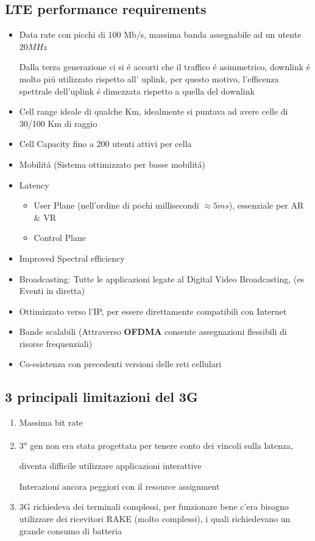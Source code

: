 \documentclass{article}
\begin{document}
\subsection{LTE performance requirements}
\begin{itemize}
    \item Data rate con picchi di 100 Mb/s, massima banda assegnabile ad un utente $20MHz$

        Dalla terza generazione ci si \'e accorti che il traffico \'e asimmetrico, downlink \'e molto pi\'u utilizzato rispetto all' uplink, per questo motivo, l'efficenza spettrale dell'uplink \'e dimezzata rispetto a quella del downlink

    \item Cell range ideale di qualche Km, idealmente si puntava ad avere celle di 30/100 Km di raggio

    \item Cell Capacity fino a 200 utenti attivi per cella
    \item Mobilit\'a (Sistema ottimizzato per basse mobilit\'a)
    \item Latency
        \begin{itemize}
            \item User Plane (nell'ordine di pochi millisecondi $\approx 5ms$), essenziale per AR \& VR
            \item Control Plane
        \end{itemize}

    \item Improved Spectral efficiency
    \item Broadcasting: Tutte le applicazioni legate al Digital Video Broadcasting, (es Eventi in diretta)
    \item Ottimizzato verso l'IP, per essere direttamente compatibili con Internet
    \item Bande scalabili (Attraverso \textbf{OFDMA} consente assegnazioni flessibili di risorse frequenziali)
    \item Co-esistenza con precedenti versioni delle reti cellulari
\end{itemize}

\subsection{3 principali limitazioni del 3G}
\begin{enumerate}
    \item Massima bit rate  %
    \item 3\textsuperscript{a} gen non era stata progettata per tenere conto dei vincoli sulla latenza,

        diventa difficile utilizzare applicazioni interattive

        Interazioni ancora peggiori con il resource assignment
    \item 3G richiedeva dei terminali complessi, per funzionare bene c'era bisogno utilizzare dei ricevitori RAKE (molto complessi), i quali richiedevano un grande consumo di batteria
\end{enumerate}
\end{document}
